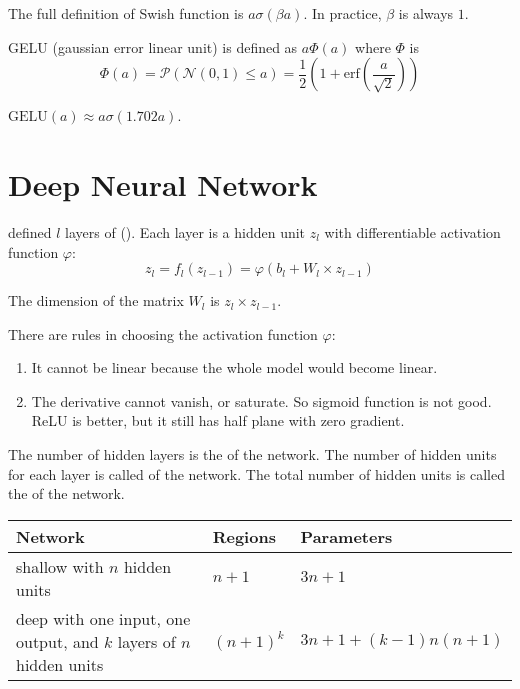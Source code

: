 \begin{example}[Swish]
    The full definition of Swish function is $a\sigma(\beta a)$. In practice, $\beta$ is always $1$. 
\end{example}

\begin{example}[GELU]
    GELU (gaussian error linear unit) is defined as $a \Phi(a)$ where $\Phi$ is
    \begin{equation}
        \Phi(a) = \mathcal{P}(\mathcal{N}(0,1) \leq a) = \frac{1}{2}\left(1+\text{erf}\left(\frac{a}{\sqrt{2}}\right)\right)
    \end{equation}
    
    $\text{GELU}(a) \approx a \sigma(1.702 a)$. 
\end{example}



\section{Deep Neural Network}

 defined $l$ layers of  (). Each layer is a hidden unit $z_l$ with differentiable activation function $\varphi$:
\begin{equation}
    z_l = f_l (z_{l-1}) = \varphi (b_l + W_l \times z_{l-1})
\end{equation}

The dimension of the matrix $W_l$ is $z_l \times z_{l-1}$.

There are rules in choosing the activation function $\varphi$:
\begin{enumerate}
    \item It cannot be linear because the whole model would become linear.
    \item The derivative cannot vanish, or saturate. So sigmoid function is not good. ReLU is better, but it still has half plane with zero gradient.
\end{enumerate}

The number of hidden layers is the  of the network. The number of hidden units for each layer is called  of the network. The total number of hidden units is called the  of the network.

\begin{table}[H]
\centering
\begin{tabular}[t]{p{5cm}ll}
Network & Regions & Parameters \\ \hline
shallow with $n$ hidden units & $n+1$ & $3n+1$\\
deep with one input, one output, and $k$ layers of $n$ hidden units & $(n+1)^k$ & $3n+1+(k-1)n(n+1)$ \\
\end{tabular}
\end{table}


